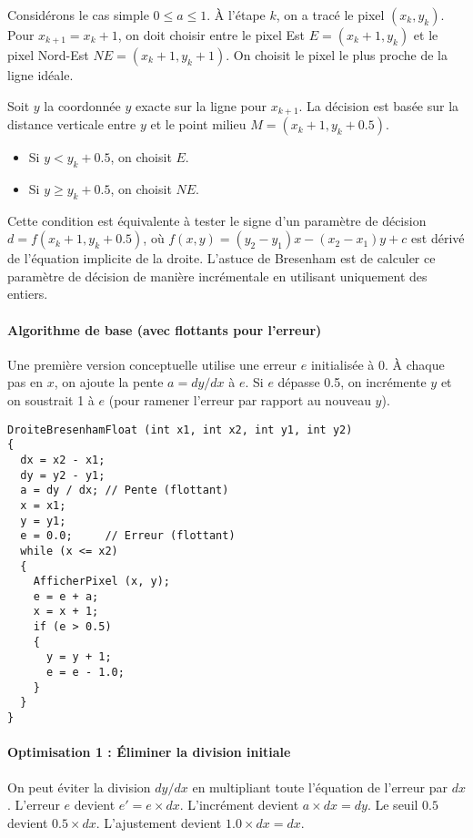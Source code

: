 \documentclass{article}
\begin{document}
Considérons le cas simple $0 \le a \le 1$. À l'étape $k$, on a tracé le pixel $(x_k, y_k)$. Pour $x_{k+1} = x_k+1$, on doit choisir entre le pixel Est $E = (x_k+1, y_k)$ et le pixel Nord-Est $NE = (x_k+1, y_k+1)$. On choisit le pixel le plus proche de la ligne idéale.

Soit $y$ la coordonnée $y$ exacte sur la ligne pour $x_{k+1}$. La décision est basée sur la distance verticale entre $y$ et le point milieu $M = (x_k+1, y_k+0.5)$.
\begin{itemize}
    \item Si $y < y_k + 0.5$, on choisit $E$.
    \item Si $y \ge y_k + 0.5$, on choisit $NE$.
\end{itemize}
Cette condition est équivalente à tester le signe d'un paramètre de décision $d = f(x_k+1, y_k+0.5)$, où $f(x, y) = (y_2-y_1)x - (x_2-x_1)y + c$ est dérivé de l'équation implicite de la droite. L'astuce de Bresenham est de calculer ce paramètre de décision de manière incrémentale en utilisant uniquement des entiers.

\paragraph{Algorithme de base (avec flottants pour l'erreur)}
Une première version conceptuelle utilise une erreur $e$ initialisée à 0. À chaque pas en $x$, on ajoute la pente $a=dy/dx$ à $e$. Si $e$ dépasse 0.5, on incrémente $y$ et on soustrait 1 à $e$ (pour ramener l'erreur par rapport au nouveau $y$).

\begin{lstlisting}[language=Pseudocode, caption={Algorithme de Bresenham (conceptuel, avec erreur flottante)}, label={lst:bresenham_float}]
DroiteBresenhamFloat (int x1, int x2, int y1, int y2)
{
  dx = x2 - x1;
  dy = y2 - y1;
  a = dy / dx; // Pente (flottant)
  x = x1;
  y = y1;
  e = 0.0;     // Erreur (flottant)
  while (x <= x2)
  {
    AfficherPixel (x, y);
    e = e + a;
    x = x + 1;
    if (e > 0.5)
    {
      y = y + 1;
      e = e - 1.0;
    }
  }
}
\end{lstlisting}

\paragraph{Optimisation 1 : Éliminer la division initiale}
On peut éviter la division $dy/dx$ en multipliant toute l'équation de l'erreur par $dx$. L'erreur $e$ devient $e' = e \times dx$.
L'incrément devient $a \times dx = dy$. Le seuil $0.5$ devient $0.5 \times dx$. L'ajustement devient $1.0 \times dx = dx$.
\end{document}
